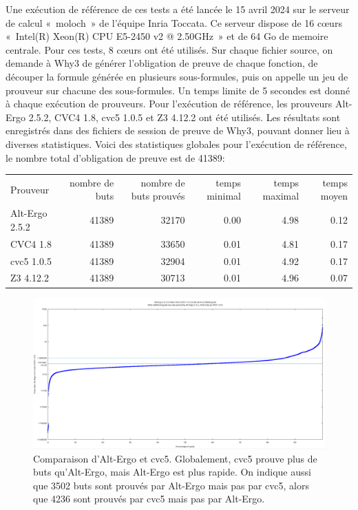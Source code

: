 \documentclass[a4paper,11pt]{article}
\begin{document}
Une exécution de référence de ces tests a été lancée le 15 avril 2024
sur le serveur de calcul «~moloch~» de l'équipe Inria Toccata. Ce
serveur dispose de 16 c{\oe}urs «~Intel(R) Xeon(R) CPU E5-2450 v2 @
2.50GHz~» et de 64 Go de memoire centrale. Pour ces tests, 8 c{\oe}urs
ont été utilisés. Sur chaque fichier source, on demande à Why3 de
générer l'obligation de preuve de chaque fonction, de découper la
formule générée en plusieurs sous-formules, puis on appelle un jeu de
prouveur sur chacune des sous-formules. Un temps limite de 5 secondes est donné à chaque exécution de prouveurs. Pour l'exécution de référence,
les prouveurs Alt-Ergo 2.5.2, CVC4 1.8, cvc5 1.0.5 et Z3 4.12.2 ont
été utilisés. Les résultats sont enregistrés dans des fichiers de
session de preuve de Why3, pouvant donner lieu à diverses
statistiques. Voici des statistiques globales pour l'exécution de
référence, le nombre total d'obligation de preuve est de 41389:
\begin{center}
  \begin{tabular}{|l|r|r|r|r|r|}
    \hline
  \rowcolor{gray!50} Prouveur
  & \multicolumn{1}{p{0.13\textwidth}|}{nombre de buts}
  & \multicolumn{1}{p{0.13\textwidth}|}{nombre de buts prouvés}
  & \multicolumn{1}{p{0.13\textwidth}|}{temps minimal}
  & \multicolumn{1}{p{0.13\textwidth}|}{temps maximal}
  & \multicolumn{1}{p{0.13\textwidth}|}{temps moyen}
  \\
  Alt-Ergo 2.5.2                & 41389 & 32170 &  0.00  & 4.98 &  0.12 \\
  CVC4 1.8                      & 41389 & 33650 &  0.01  & 4.81 &  0.17 \\
  cvc5 1.0.5                    & 41389 & 32904 &  0.01  & 4.92 &  0.17 \\
    Z3 4.12.2                     & 41389 & 30713 &  0.01  & 4.96 &  0.07 \\
    \hline
\end{tabular}
\end{center}

\begin{figure}
  \centering
  \hspace*{-0.1\textwidth}\includegraphics[width=1.2\textwidth]{AE-vs-CVC5.png}
  \caption{Comparaison d'Alt-Ergo et cvc5. Globalement, cvc5 prouve
    plus de buts qu'Alt-Ergo, mais Alt-Ergo est plus rapide. On
    indique aussi que 3502 buts sont prouvés par Alt-Ergo mais pas par
    cvc5, alors que 4236 sont prouvés par cvc5 mais pas par Alt-Ergo.}
  \label{fig:AEvsCVC5}
  \hrulefill
\end{figure}
\end{document}
